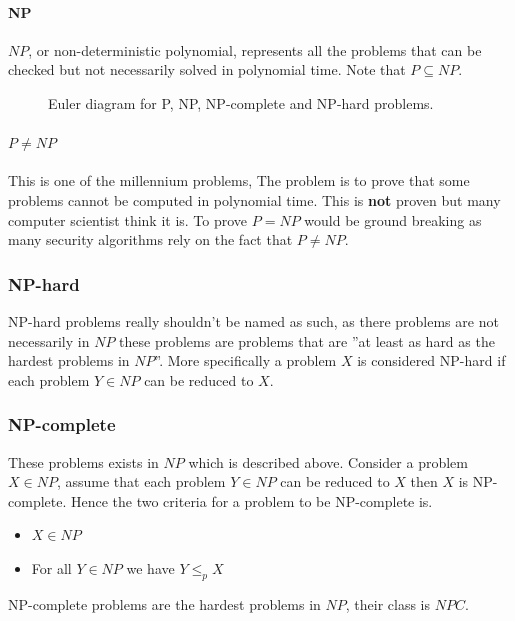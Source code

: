 \documentclass[12pt]{article} %
\begin{document}
\paragraph{NP}
$NP$, or non-deterministic polynomial, represents all the problems that can be checked but not necessarily solved in polynomial time. Note that $P \subseteq NP$.

\begin{figure}[H]
\caption{Euler diagram for P, NP, NP-complete and NP-hard problems.}
\label{npProblems}
\end{figure} 

\paragraph{$P \neq NP$}
This is one of the millennium problems, The problem is to prove that some problems cannot be computed in polynomial time. This is \textbf{not} proven but many computer scientist think it is. To prove $P = NP$ would be ground breaking as many security algorithms rely on the fact that $P \neq NP$.

\subsubsection{NP-hard}
NP-hard problems really shouldn't be named as such, as there problems are not necessarily in $NP$ these problems are problems that are ''at least as hard as the hardest problems in $NP$''. More specifically a problem $X$ is considered NP-hard if each problem $Y \in NP$ can be reduced to $X$.

\subsubsection{NP-complete}
These problems exists in $NP$ which is described above. Consider a problem $X \in NP$, assume that each problem $Y \in NP$ can be reduced to $X$ then $X$ is NP-complete. Hence the two criteria for a problem to be NP-complete is.
\begin{itemize}
    \item $X \in NP$
    \item For all $Y \in NP$ we have $Y \leq_{p} X$
\end{itemize}
NP-complete problems are the hardest problems in $NP$, their class is $NPC$.
\end{document}
